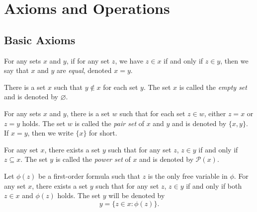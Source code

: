 \chapter{Axioms and Operations}
\section{Basic Axioms}
\begin{axiom}[Extensionality]
  For any sets $x$ and $y$, if for any set $z$, we have $z \in x$ if and only
  if $z \in y$, then we say that $x$ and $y$ are \emph{equal}, denoted $x = y$.
\end{axiom}

\begin{axiom}
  There is a set $x$ such that $y \notin x$ for each set $y$.
  The set $x$ is called the \emph{empty set} and is denoted by $\varnothing$.
\end{axiom}

\begin{axiom}[Pairing]
  For any sets $x$ and $y$, there is a set $w$ such that for each set
  $z \in w$, either $z = x$ or $z = y$ holds.
  The set $w$ is called the \emph{pair set} of $x$ and $y$ and is denoted by
  $\{x, y\}$.
  If $x = y$, then we write $\{x\}$ for short.
\end{axiom}

\begin{axiom}
  For any set $x$, there exists a set $y$ such that for any set $z$, $z \in y$
  if and only if $z \subseteq x$.
  The set $y$ is called the \emph{power set} of $x$ and is denoted by
  $\mathcal{P}(x)$.
\end{axiom}

\begin{axiom}[Subset]
  Let $\phi(z)$ be a first-order formula such that $z$ is the only free
  variable in $\phi$.
  For any set $x$, there exists a set $y$ such that for any set $z$, $z \in y$
  if and only if both $z \in x$ and $\phi(z)$ holds.
  The set $y$ will be denoted by
  \begin{equation*}
    y = \{z \in x: \phi(z)\}.
  \end{equation*}
\end{axiom}
